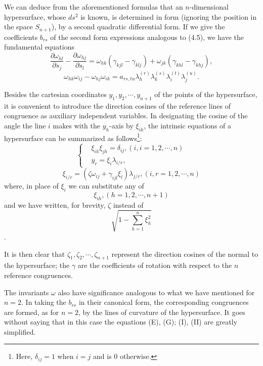 \documentclass{book}
\begin{document}
We can deduce from the aforementioned formulas that an $n$-dimensional hypersurface, whose $ds^2$ is known, is determined in form (ignoring the position in the space $S_{n+1}$), by a second quadratic differential form. If we give the coefficients $b_{rs}$ of the second form expressions analogous to (4.5), we have the fundamental equations
\begin{equation*}
\frac{\partial\omega_{hl}}{\partial s_j}-\frac{\partial\omega_{hj}}{\partial s_l}=\omega_{hk}(\gamma_{kjl}-\gamma_{klj})+\omega_{jk}(\gamma_{khl}-\gamma_{khj}),
\tag{C}
\end{equation*}
\begin{equation*}
\omega_{hk}\omega_{ij}-\omega_{hj}\omega_{ik}=a_{rs,tu}\lambda_h^{(r)}\lambda_k^{(s)}\lambda_i^{(t)}\lambda_j^{(u)}.
\tag{G}
\end{equation*}

Besides the cartesian coordinates $y_1,y_2,\cdots,y_{n+1}$ of the points of the hypersurface, it is convenient to introduce the direction cosines of the reference lines of congruence as auxiliary independent variables. In designating the cosine of the angle the line $i$ makes with the $y_h$-axis by $\xi_{ih}$, the intrinsic equations of a hypersurface can be summarized as follows\footnote{Here, $\delta_{ij}=1$ when $i=j$ and is $0$ otherwise.}:
\begin{equation*}
\begin{cases}
&\xi_{ih}\xi_{jh}=\delta_{ij}, (i,i=1,2,\cdots,n)\\
&y_r=\xi_i\lambda_{i/r},
\end{cases}
\tag{I}
\end{equation*}
\begin{equation*}
\xi_{i/r}=\left(\zeta\omega_{ij}+\gamma_{ijl}\xi_l\right)\lambda_{j/r}, (i,r=1,2,\cdots,n)
\tag{II}
\end{equation*}
where, in place of $\xi_i$ we can substitute any of
$$\xi_{ih}, (h=1,2,\cdots,n+1)$$
and we have written, for brevity, $\zeta$ instead of
$$\sqrt{1-\sum_{h=1}^n\xi_h^2}$$.

It is then clear that $\zeta_1,\zeta_2,\cdots,\zeta_{n+1}$ represent the direction cosines of the normal to the hypersurface; the $\gamma$ are the coefficients of rotation with respect to the $n$ reference congruences. 

The invariants $\omega$ also have significance analogous to what we have mentioned for $n=2$. In taking the $b_{rs}$ in their canonical form, the corresponding congruences are formed, as for $n=2$, by the lines of curvature of the hypersurface. It goes without saying that in this case the equations (E), (G); (I), (II) are greatly simplified. 
\end{document}
